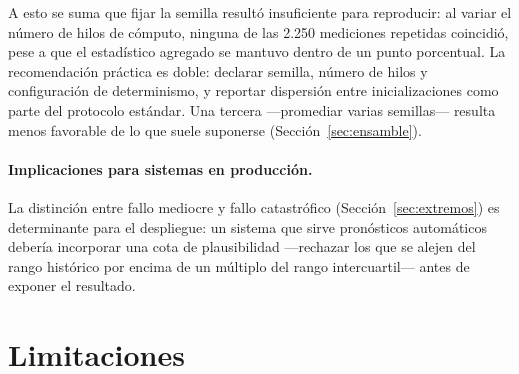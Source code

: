 A esto se suma que fijar la semilla resultó insuficiente para reproducir: al variar el
número de hilos de cómputo, ninguna de las 2.250 mediciones repetidas coincidió, pese a
que el estadístico agregado se mantuvo dentro de un punto porcentual. La recomendación
práctica es doble: declarar semilla, número de hilos y configuración de determinismo, y
reportar dispersión entre inicializaciones como parte del protocolo estándar. Una tercera
---promediar varias semillas--- resulta menos favorable de lo que suele suponerse
(Sección~\ref{sec:ensamble}).

\paragraph{Implicaciones para sistemas en producción.} La distinción entre fallo mediocre
y fallo catastrófico (Sección~\ref{sec:extremos}) es determinante para el despliegue: un
sistema que sirve pronósticos automáticos debería incorporar una cota de plausibilidad
---rechazar los que se alejen del rango histórico por encima de un múltiplo del rango
intercuartil--- antes de exponer el resultado.


\section{Limitaciones}\label{sec:limitaciones}

